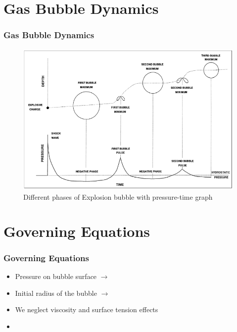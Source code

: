 \documentclass{beamer}
\begin{document}
\section{Gas Bubble Dynamics}
\begin{frame}
\frametitle{Gas Bubble Dynamics}
\begin{figure}[h]  
\begin{center}  
\includegraphics[scale=0.350]{4.png}
\caption{\tiny{Different phases of Explosion bubble with pressure-time graph}}
\end{center}  
\end{figure}
\end{frame}


\section{Governing Equations}
\begin{frame}
\frametitle{Governing Equations}
\begin{itemize}
  \item Pressure on bubble surface $\rightarrow$ \\
  \item Initial radius of the bubble $\rightarrow$  \\
  \item We neglect viscosity and surface tension effects
  \item 

\end{itemize}

\end{frame}
\end{document}
